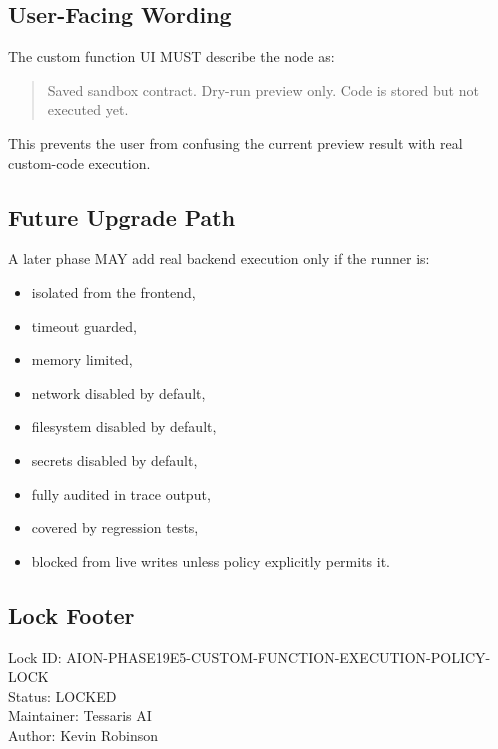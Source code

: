 \subsection{User-Facing Wording}

The custom function UI MUST describe the node as:

\begin{quote}
Saved sandbox contract. Dry-run preview only. Code is stored but not executed yet.
\end{quote}

This prevents the user from confusing the current preview result with real custom-code execution.

\subsection{Future Upgrade Path}

A later phase MAY add real backend execution only if the runner is:

\begin{itemize}
  \item isolated from the frontend,
  \item timeout guarded,
  \item memory limited,
  \item network disabled by default,
  \item filesystem disabled by default,
  \item secrets disabled by default,
  \item fully audited in trace output,
  \item covered by regression tests,
  \item blocked from live writes unless policy explicitly permits it.
\end{itemize}

\subsection{Lock Footer}

Lock ID: AION-PHASE19E5-CUSTOM-FUNCTION-EXECUTION-POLICY-LOCK \\
Status: LOCKED \\
Maintainer: Tessaris AI \\
Author: Kevin Robinson
